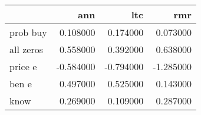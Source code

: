 \begin{tabular}{lrrr}
\toprule
 & ann & ltc & rmr \\
\midrule
prob buy & 0.108000 & 0.174000 & 0.073000 \\
all zeros & 0.558000 & 0.392000 & 0.638000 \\
price e & -0.584000 & -0.794000 & -1.285000 \\
ben e & 0.497000 & 0.525000 & 0.143000 \\
know & 0.269000 & 0.109000 & 0.287000 \\
\bottomrule
\end{tabular}

